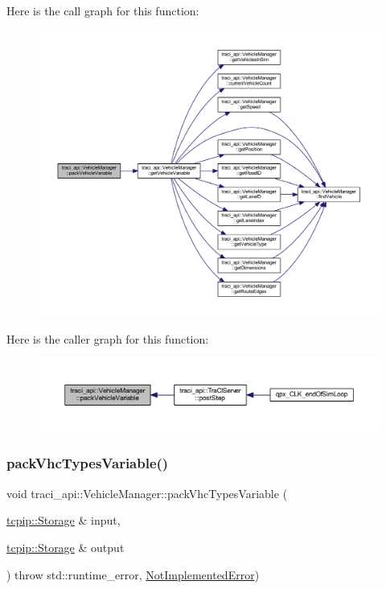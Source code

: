 Here is the call graph for this function\+:\nopagebreak
\begin{figure}[H]
\begin{center}
\leavevmode
\includegraphics[width=350pt]{classtraci__api_1_1_vehicle_manager_a4b246d7f01b5f37679830f677328fc16_cgraph}
\end{center}
\end{figure}
Here is the caller graph for this function\+:\nopagebreak
\begin{figure}[H]
\begin{center}
\leavevmode
\includegraphics[width=350pt]{classtraci__api_1_1_vehicle_manager_a4b246d7f01b5f37679830f677328fc16_icgraph}
\end{center}
\end{figure}
\mbox{\label{classtraci__api_1_1_vehicle_manager_abf96c7635d046d03bc02aa0cbc384d17}} 
\subsubsection{\texorpdfstring{pack\+Vhc\+Types\+Variable()}{packVhcTypesVariable()}}
{\footnotesize\ttfamily void traci\+\_\+api\+::\+Vehicle\+Manager\+::pack\+Vhc\+Types\+Variable (\begin{DoxyParamCaption}\item[{\hyperlink{classtcpip_1_1_storage}{tcpip\+::\+Storage} \&}]{input,  }\item[{\hyperlink{classtcpip_1_1_storage}{tcpip\+::\+Storage} \&}]{output }\end{DoxyParamCaption}) throw  std\+::runtime\+\_\+error, \hyperlink{classtraci__api_1_1_not_implemented_error}{Not\+Implemented\+Error}) }


